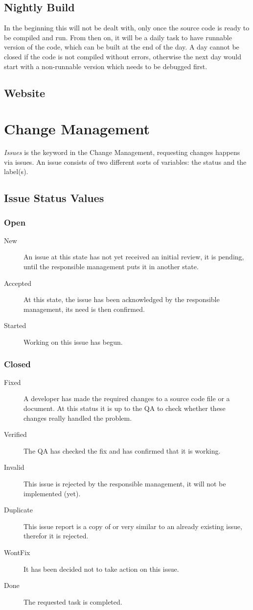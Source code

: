 \documentclass{report}
\begin{document}
\section{Nightly Build}
In the beginning this will not be dealt with, only once the source code is ready to be compiled and run.
From then on, it will be a daily task to have runnable version of the code, which can be built at the end of the day.
A day cannot be closed if the code is not compiled without errors, otherwise the next day would start with a non-runnable version which needs to be debugged first.

\section{Website}

\chapter{Change Management}
{\it Issues} is the keyword in the Change Management, requesting changes happens via issues.
An issue consists of two different sorts of variables: the status and the label(s).

\section{Issue Status Values}
\subsection{Open}
\begin{description}
\item[New]
An issue at this state has not yet received an initial review, it is pending, until the responsible management puts it in another state.
\item[Accepted]
At this state, the issue has been acknowledged by the responsible management, its need is then confirmed.
\item[Started]
Working on this issue has begun.
\end{description}
\subsection{Closed}
\begin{description}
\item[Fixed]
A developer has made the required changes to a source code file or a document.
At this status it is up to the QA to check whether these changes really handled the problem.
\item[Verified]
The QA has checked the fix and has confirmed that it is working.
\item[Invalid]
This issue is rejected by the responsible management, it will not be implemented (yet).
\item[Duplicate]
This issue report is a copy of or very similar to an already existing issue, therefor it is rejected.
\item[WontFix]
It has been decided not to take action on this issue.
\item[Done]
The requested task is completed.
\end{description}
\end{document}
